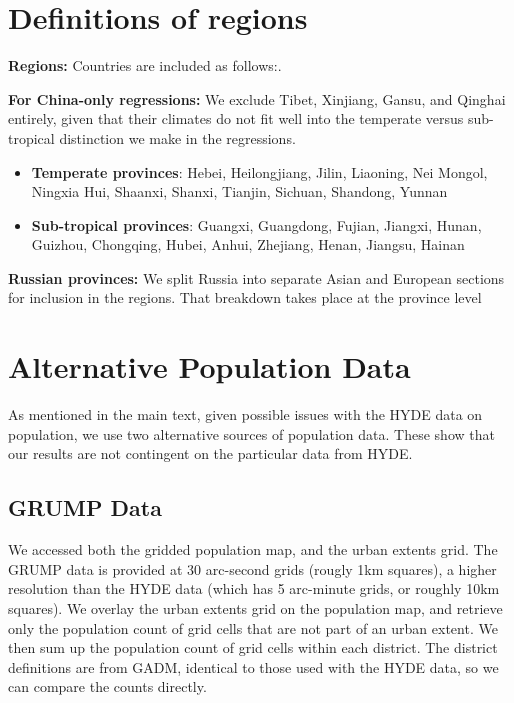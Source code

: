 \documentclass[11pt]{article}
\begin{document}
\section{Definitions of regions}

\noindent\textbf{Regions:} Countries are included as follows:. 
\begin{itemize}
    \setlength\itemsep{0pt}
    
\end{itemize}

\noindent\textbf{For China-only regressions:} We exclude Tibet, Xinjiang, Gansu, and Qinghai entirely, given that their climates do not fit well into the temperate versus sub-tropical distinction we make in the regressions.
\begin{itemize}
    \setlength\itemsep{0pt}
    \item \textbf{Temperate provinces}: Hebei, Heilongjiang, Jilin, Liaoning, Nei Mongol, Ningxia Hui, Shaanxi, Shanxi, Tianjin, Sichuan, Shandong, Yunnan
    \item \textbf{Sub-tropical provinces}: Guangxi, Guangdong, Fujian, Jiangxi, Hunan, Guizhou, Chongqing, Hubei, Anhui, Zhejiang, Henan, Jiangsu, Hainan
\end{itemize}

\noindent\textbf{Russian provinces:} We split Russia into separate Asian and European sections for inclusion in the regions. That breakdown takes place at the province level
\begin{itemize}
    \setlength\itemsep{0pt}
    
\end{itemize}

\section{Alternative Population Data}
As mentioned in the main text, given possible issues with the HYDE data on population, we use two alternative sources of population data. These show that our results are not contingent on the particular data from HYDE.

\subsection{GRUMP Data}
We accessed both the gridded population map, and the urban extents grid. The GRUMP data is provided at 30 arc-second grids (rougly 1km squares), a higher resolution than the HYDE data (which has 5 arc-minute grids, or roughly 10km squares). We overlay the urban extents grid on the population map, and retrieve only the population count of grid cells that are not part of an urban extent. We then sum up the population count of grid cells within each district. The district definitions are from GADM, identical to those used with the HYDE data, so we can compare the counts directly.
\end{document}
